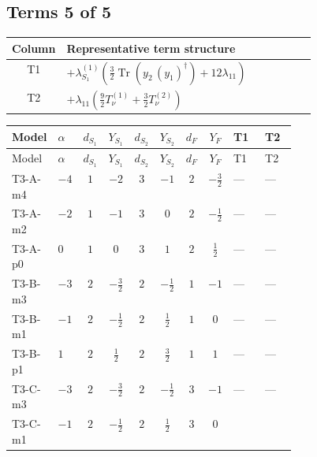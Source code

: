 \documentclass[8pt]{article}
\begin{document}
\begin{landscape}
\subsection*{Terms 5 of 5}
\begin{center}
\begin{tabular}{@{}c >{\raggedright\arraybackslash}p{0.82\linewidth}@{}}
\toprule
Column & Representative term structure \\
\midrule
T1 & \(\displaystyle +{\lambda_{S_1}^{(1)}} \left(\frac{3}{2} \operatorname{Tr}\!\left({y_2}\,\left({y_1}\right)^{\dagger}\right)+12 {\lambda_{11}}\right)\) \\
\midrule
T2 & \(\displaystyle +{\lambda_{11}} \left(\frac{9}{2} T_{\nu}^{(1)}+\frac{3}{2} T_{\nu}^{(2)}\right)\) \\
\midrule
\bottomrule
\end{tabular}
\end{center}
\smallskip
\tiny
\begin{longtable}{@{}llcccccc >{\raggedright\arraybackslash}p{0.21\linewidth} >{\raggedright\arraybackslash}p{0.21\linewidth}@{}}
\toprule
Model & $\alpha$ & $d_{S_1}$ & $Y_{S_1}$ & $d_{S_2}$ & $Y_{S_2}$ & $d_F$ & $Y_F$ & T1 & T2 \\
\midrule
\endfirsthead
\toprule
Model & $\alpha$ & $d_{S_1}$ & $Y_{S_1}$ & $d_{S_2}$ & $Y_{S_2}$ & $d_F$ & $Y_F$ & T1 & T2 \\
\midrule
\endhead
T3-A-m4 & $-4$ & $1$ & $-2$ & $3$ & $-1$ & $2$ & $-\frac{3}{2}$ & --- & --- \\
\midrule
T3-A-m2 & $-2$ & $1$ & $-1$ & $3$ & $0$ & $2$ & $-\frac{1}{2}$ & --- & --- \\
\midrule
T3-A-p0 & $0$ & $1$ & $0$ & $3$ & $1$ & $2$ & $\frac{1}{2}$ & --- & --- \\
\midrule
T3-B-m3 & $-3$ & $2$ & $-\frac{3}{2}$ & $2$ & $-\frac{1}{2}$ & $1$ & $-1$ & --- & --- \\
\midrule
T3-B-m1 & $-1$ & $2$ & $-\frac{1}{2}$ & $2$ & $\frac{1}{2}$ & $1$ & $0$ & --- & --- \\
\midrule
T3-B-p1 & $1$ & $2$ & $\frac{1}{2}$ & $2$ & $\frac{3}{2}$ & $1$ & $1$ & --- & --- \\
\midrule
T3-C-m3 & $-3$ & $2$ & $-\frac{3}{2}$ & $2$ & $-\frac{1}{2}$ & $3$ & $-1$ & --- & --- \\
\midrule
T3-C-m1 & $-1$ & $2$ & $-\frac{1}{2}$ & $2$ & $\frac{1}{2}$ & $3$ & $0$ & \scriptsize\adjustbox{max width=\linewidth}{$\begin{gathered} +{\lambda_{S_1}^{(1)}} \left(\frac{3}{2} \operatorname{Tr}\!\left({y_2}\,\left({y_1}\right)^{\dagger}\right)+12 {\lambda_{11}}\right)\end{gathered}$} & \scriptsize\adjustbox{max width=\linewidth}{$\begin{gathered} +{\lambda_{11}} \left(\frac{9}{2} T_{\nu}^{(1)}+\frac{3}{2} T_{\nu}^{(2)}\right)\end{gathered}$} \\

\end{longtable}
\end{landscape}
\end{document}
